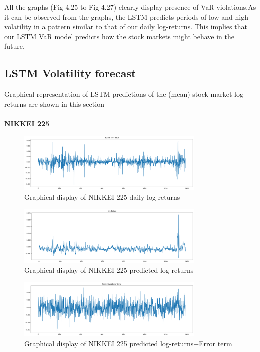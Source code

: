 \documentclass[a4paper,11pt,oneside]{book}
\begin{document}
All the graphs (Fig 4.25 to Fig 4.27) clearly display presence of VaR violations.As it can be observed from the graphs, the LSTM predicts periods of low and high volatility in a pattern similar to that of our daily log-returns. This implies that our LSTM VaR model predicts how the stock markets might behave in the future.

	
\subsection{LSTM Volatility forecast}
Graphical representation of LSTM predictions of the (mean) stock market log returns are shown in this section\\\\
\textbf{NIKKEI 225}
\begin{figure}[!h]
	\centering
	\includegraphics[width=0.8\textwidth]{figures/NIKKEITEST}
	\caption{Graphical display of NIKKEI 225 daily log-returns}
	\label{NIKKEITEST}
\end{figure}
\begin{figure}[!h]
	\centering
	\includegraphics[width=0.8\textwidth]{figures/NIKKEIPRED}
	\caption{Graphical display of NIKKEI 225 predicted log-returns}
	\label{NIKKEIPRED}
\end{figure}

\begin{figure}[!h]
	\centering
	\includegraphics[width=0.8\textwidth]{figures/NIKKEIERROR}
	\caption{Graphical display of NIKKEI 225 predicted log-returns+Error term}
	\label{NIKKEIERROR}
\end{figure}
\newpage
\vfill
\end{document}
